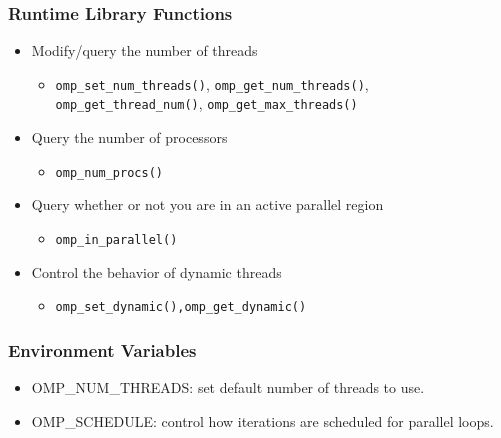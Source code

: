 \documentclass[10pt,t]{beamer}
\begin{document}
\begin{frame}
  \frametitle{Runtime Library Functions}
  \begin{itemize}
    \item Modify/query the number of threads
    \begin{itemize}
      \item \texttt{omp\_set\_num\_threads()}, \texttt{omp\_get\_num\_threads()}, \texttt{omp\_get\_thread\_num()}, \texttt{omp\_get\_max\_threads()}
    \end{itemize}
    \item Query the number of processors
    \begin{itemize}
      \item \texttt{omp\_num\_procs()}
    \end{itemize}
    \item Query whether or not you are in an active parallel region
    \begin{itemize}
      \item \texttt{omp\_in\_parallel()}
    \end{itemize}
    \item Control the behavior of dynamic threads
    \begin{itemize}
      \item \texttt{omp\_set\_dynamic(),omp\_get\_dynamic()}
    \end{itemize}
  \end{itemize}
\end{frame}

\begin{frame}
  \frametitle{Environment Variables}
  \begin{itemize}
    \item OMP\_NUM\_THREADS: set default number of threads to use.
    \item OMP\_SCHEDULE: control how iterations are scheduled for parallel loops.
  \end{itemize}
\end{frame}
\end{document}
